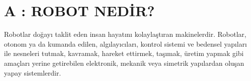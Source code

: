 \chapter{A : ROBOT NEDİR?}
\label{BirinciBolum}

	Robotlar doğayı taklit eden insan hayatını kolaylaştıran makinelerdir. Robotlar, otonom ya da kumanda edilen, algılayıcıları, kontrol sistemi ve bedensel yapıları ile nesneleri tutmak, kavramak, hareket ettirmek, taşımak, üretim yapmak gibi amaçları yerine getirebilen elektronik, mekanik veya simetrik yapılardan oluşan yapay sistemlerdir.
    
    \clearpage
